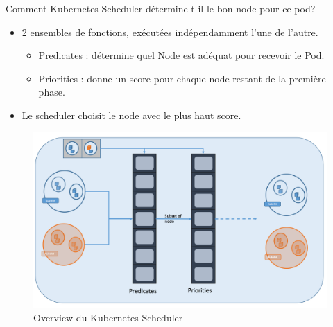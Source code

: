 \documentclass{bredelebeamer}
\begin{document}
\begin{frame}{Comment Kubernetes Scheduler détermine-t-il le bon node pour ce pod?}
\begin{itemize}
\item 2 ensembles de fonctions, exécutées indépendamment l'une de l'autre.
\begin{itemize}
\item Predicates : détermine quel Node est adéquat pour recevoir le Pod.
\item Priorities : donne un score pour chaque node restant de la première phase.
\end{itemize}
\item Le scheduler choisit le node avec le plus haut score.
\end{itemize}

\begin{figure}
\centering
\includegraphics[scale=0.3]{images/img26.png}
\caption{Overview du Kubernetes Scheduler}
\end{figure}
\end{frame}
\end{document}
